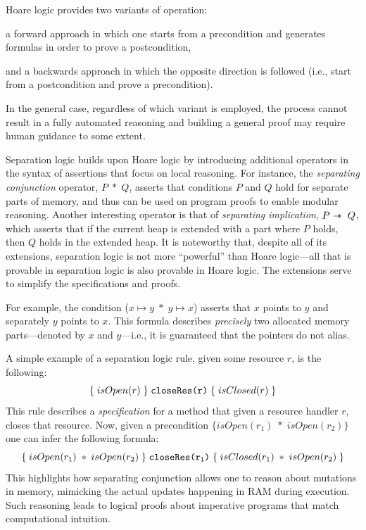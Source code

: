 Hoare logic provides two variants of operation:
\begin{inparaenum}[(1)]
\item a forward approach in which one starts from a precondition and generates formulas in order to prove a postcondition,
\item and a backwards approach in which the opposite direction is followed (i.e., start from a postcondition and prove a precondition).
\end{inparaenum}
In the general case, regardless of which variant is employed, the process cannot result in a fully automated reasoning and building a general proof may require human guidance to some extent.

Separation logic builds upon Hoare logic by introducing additional operators in the syntax of assertions that focus on local reasoning. For instance, the \emph{separating conjunction} operator, $P \; * \; Q$, asserts that conditions $P$ and $Q$ hold for separate parts of memory, and thus can be used on program proofs to enable modular reasoning. Another interesting operator is that of \emph{separating implication}, $P \mathrel{-\mkern-6mu*} \; Q$, which asserts that if the current heap is extended with a part where $P$ holds, then $Q$ holds in the extended heap. It is noteworthy that, despite all of its extensions, separation logic is not more ``powerful'' than Hoare logic---all that is provable in separation logic is also provable in Hoare logic. The extensions serve to simplify the specifications and proofs.

For example, the condition ($x \mapsto y \; * \; y \mapsto x$) asserts that $x$ points to $y$ and separately $y$ points to $x$. This formula describes \emph{precisely} two allocated memory parts---denoted by $x$ and $y$---i.e., it is guaranteed that the pointers do not alias.

A simple example of a separation logic rule, given some resource $r$, is the following: 
\[
\{ \; isOpen(r) \; \} \; \texttt{closeRes(r)} \; \{ \; isClosed(r) \; \}
\]
This rule describes a \emph{specification} for a method  that given a resource handler $r$, closes that resource. Now, given a precondition $\{isOpen(r_1) \; * \; isOpen(r_2)\}$ one can infer the following formula:
\[
\{ \; isOpen(r_1) \; * \; isOpen(r_2) \; \} \; \texttt{closeRes(r\textsubscript{1})} \; \{ \; isClosed(r_1) \; * \; isOpen(r_2) \; \}
\]
This highlights how separating conjunction allows one to reason about mutations in memory, mimicking the actual updates happening in RAM during execution. Such reasoning leads to logical proofs about imperative programs that match computational intuition.


